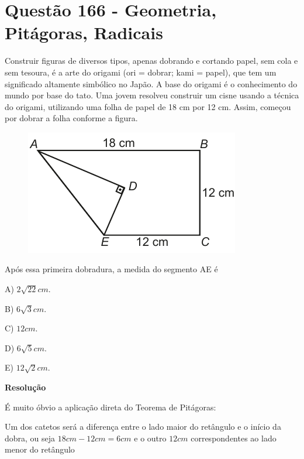 \section{Questão 166 - Geometria, Pitágoras, Radicais}

Construir figuras de diversos tipos, apenas dobrando e cortando papel, sem cola e sem tesoura, é a arte do origami (ori = dobrar; kami = papel), que tem um significado altamente simbólico no Japão. A base do origami é o conhecimento do mundo por base do tato. Uma jovem resolveu construir um cisne usando a técnica do origami, utilizando uma folha de papel de 18 cm por 12 cm. Assim, começou por dobrar a folha conforme a figura.

\begin{figure}[H]
    \centering
    \includegraphics[width=0.95\linewidth]{Q166.pdf}
    \label{fig:q166}
\end{figure}

Após essa primeira dobradura, a medida do segmento AE é

A) $ 2\sqrt{22} cm $.

B) $ 6\sqrt{3} cm $.

C) $ 12 cm $.

D) $ 6\sqrt{5} cm $.

E) $ 12\sqrt{2} cm $.

\textbf{Resolução}

É muito óbvio a aplicação direta do Teorema de Pitágoras:

Um dos catetos será a diferença entre o lado maior do retângulo e o início da dobra, ou seja $ 18cm - 12cm = 6cm $ e o outro $12 cm$ correspondentes ao lado menor do retângulo



